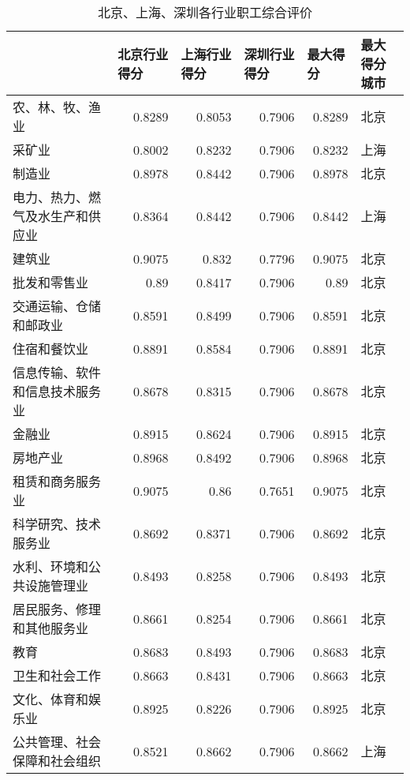 \documentclass[withoutpreface,bwprint]{cumcmthesis} %
\begin{document}
\begin{table}[htbp]\small
  \centering
  \caption{北京、上海、深圳各行业职工综合评价}
    \begin{tabular}{l|rrr|rl}
      & \multicolumn{1}{l}{北京行业得分} & \multicolumn{1}{l}{上海行业得分} & \multicolumn{1}{l|}{深圳行业得分} & \multicolumn{1}{l}{最大得分} & 最大得分城市 \\
    \midrule
    农、林、牧、渔业 & 0.8289 & 0.8053 & 0.7906 & 0.8289 & 北京 \\
    采矿业 & 0.8002 & 0.8232 & 0.7906 & 0.8232 & 上海 \\
    制造业 & 0.8978 & 0.8442 & 0.7906 & 0.8978 & 北京 \\
    电力、热力、燃气及水生产和供应业 & 0.8364 & 0.8442 & 0.7906 & 0.8442 & 上海 \\
    建筑业 & 0.9075 & 0.832 & 0.7796 & 0.9075 & 北京 \\
    批发和零售业 & 0.89 & 0.8417 & 0.7906 & 0.89 & 北京 \\
    交通运输、仓储和邮政业 & 0.8591 & 0.8499 & 0.7906 & 0.8591 & 北京 \\
    住宿和餐饮业 & 0.8891 & 0.8584 & 0.7906 & 0.8891 & 北京 \\
    信息传输、软件和信息技术服务业 & 0.8678 & 0.8315 & 0.7906 & 0.8678 & 北京 \\
    金融业 & 0.8915 & 0.8624 & 0.7906 & 0.8915 & 北京 \\
    房地产业 & 0.8968 & 0.8492 & 0.7906 & 0.8968 & 北京 \\
    租赁和商务服务业 & 0.9075 & 0.86 & 0.7651 & 0.9075 & 北京 \\
    科学研究、技术服务业 & 0.8692 & 0.8371 & 0.7906 & 0.8692 & 北京 \\
    水利、环境和公共设施管理业 & 0.8493 & 0.8258 & 0.7906 & 0.8493 & 北京 \\
    居民服务、修理和其他服务业 & 0.8661 & 0.8254 & 0.7906 & 0.8661 & 北京 \\
    教育 & 0.8683 & 0.8493 & 0.7906 & 0.8683 & 北京 \\
    卫生和社会工作 & 0.8663 & 0.8431 & 0.7906 & 0.8663 & 北京 \\
    文化、体育和娱乐业 & 0.8925 & 0.8226 & 0.7906 & 0.8925 & 北京 \\
    公共管理、社会保障和社会组织 & 0.8521 & 0.8662 & 0.7906 & 0.8662 & 上海 \\
    \end{tabular}%
  \label{tab:北京、上海、深圳各行业职工综合评价}%
\end{table}%
\end{document}
